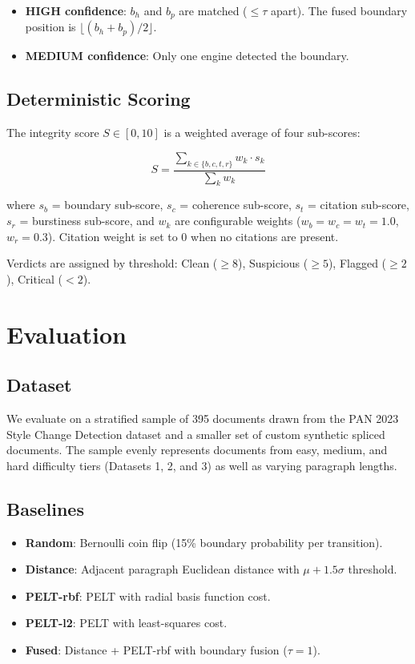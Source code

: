 \documentclass[conference]{IEEEtran}
\begin{document}
\begin{itemize}
    \item \textbf{HIGH confidence}: $b_h$ and $b_p$ are matched ($\leq \tau$ apart). The fused boundary position is $\lfloor(b_h + b_p)/2\rfloor$.
    \item \textbf{MEDIUM confidence}: Only one engine detected the boundary.
\end{itemize}

\subsection{Deterministic Scoring}
\label{sec:scoring}

The integrity score $S \in [0, 10]$ is a weighted average of four sub-scores:

\begin{equation}
S = \frac{\sum_{k \in \{b,c,t,r\}} w_k \cdot s_k}{\sum_{k} w_k}
\end{equation}

where $s_b$ = boundary sub-score, $s_c$ = coherence sub-score, $s_t$ = citation sub-score, $s_r$ = burstiness sub-score, and $w_k$ are configurable weights ($w_b = w_c = w_t = 1.0$, $w_r = 0.3$). Citation weight is set to 0 when no citations are present.

Verdicts are assigned by threshold: Clean ($\geq 8$), Suspicious ($\geq 5$), Flagged ($\geq 2$), Critical ($< 2$).

\section{Evaluation}
\label{sec:evaluation}

\subsection{Dataset}
We evaluate on a stratified sample of 395 documents drawn from the PAN 2023 Style Change Detection dataset and a smaller set of custom synthetic spliced documents. The sample evenly represents documents from easy, medium, and hard difficulty tiers (Datasets 1, 2, and 3) as well as varying paragraph lengths.

\subsection{Baselines}
\begin{itemize}
    \item \textbf{Random}: Bernoulli coin flip (15\% boundary probability per transition).
    \item \textbf{Distance}: Adjacent paragraph Euclidean distance with $\mu + 1.5\sigma$ threshold.
    \item \textbf{PELT-rbf}: PELT with radial basis function cost.
    \item \textbf{PELT-l2}: PELT with least-squares cost.
    \item \textbf{Fused}: Distance + PELT-rbf with boundary fusion ($\tau = 1$).
\end{itemize}
\end{document}
